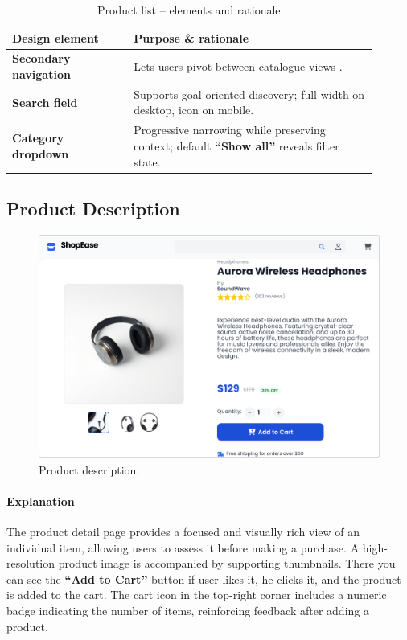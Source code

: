\documentclass[12pt]{article}
\begin{document}
	\begin{table}[H]
		\centering
		\caption{Product list – elements and rationale}
		\label{tab:product-elements}
		\begin{tabular}{p{0.30\linewidth} p{0.60\linewidth}}
			\hline
			\textbf{Design element} 		 & Purpose \& rationale \\ 	\hline
			\textbf{Secondary navigation}    & Lets users pivot between catalogue views .\\
			\textbf{Search field}            & Supports goal-oriented discovery; full-width on desktop, icon on mobile.\\
			\textbf{Category dropdown}       & Progressive narrowing while preserving context; default \textbf{“Show all”} reveals filter state.\\
			\hline
		\end{tabular}
	\end{table}

	\subsection{Product Description}\label{subsec:product-description}

	\begin{figure}[H]
		\centering
		\includegraphics[width=\linewidth]{pictures/main/Product_Description_Figma}
		\caption{Product description.}
		\label{fig:ui-products_description}
	\end{figure}

	\paragraph{Explanation}
	The product detail page provides a focused and visually rich view of an individual item, allowing users to assess it before making a purchase.
	A high-resolution product image is accompanied by supporting thumbnails.
	There you can see the \textbf{``Add to Cart''} button if user likes it, he clicks it, and the product is added to the cart.
	The cart icon in the top-right corner includes a numeric badge indicating the number of items, reinforcing feedback after adding a product.
\end{document}
